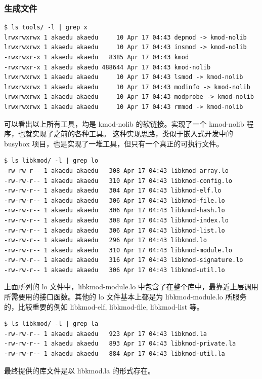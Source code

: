 \documentclass[11pt,a4paper]{article}
\begin{document}
\subsubsection{生成文件}

{\begin{shaded}\begin{verbatim}
$ ls tools/ -l | grep x
lrwxrwxrwx 1 akaedu akaedu     10 Apr 17 04:43 depmod -> kmod-nolib
lrwxrwxrwx 1 akaedu akaedu     10 Apr 17 04:43 insmod -> kmod-nolib
-rwxrwxr-x 1 akaedu akaedu   8385 Apr 17 04:43 kmod
-rwxrwxr-x 1 akaedu akaedu 488644 Apr 17 04:43 kmod-nolib
lrwxrwxrwx 1 akaedu akaedu     10 Apr 17 04:43 lsmod -> kmod-nolib
lrwxrwxrwx 1 akaedu akaedu     10 Apr 17 04:43 modinfo -> kmod-nolib
lrwxrwxrwx 1 akaedu akaedu     10 Apr 17 04:43 modprobe -> kmod-nolib
lrwxrwxrwx 1 akaedu akaedu     10 Apr 17 04:43 rmmod -> kmod-nolib
\end{verbatim}\end{shaded}}
可以看出以上所有工具，均是 kmod-nolib 的软链接。实现了一个 kmod-nolib
程序，也就实现了之前的各种工具。 这种实现思路，类似于嵌入式开发中的
busybox 项目，也是实现了一堆工具，但只有一个真正的可执行文件。

{\begin{shaded}\begin{verbatim}
$ ls libkmod/ -l | grep lo 
-rw-rw-r-- 1 akaedu akaedu   308 Apr 17 04:43 libkmod-array.lo
-rw-rw-r-- 1 akaedu akaedu   310 Apr 17 04:43 libkmod-config.lo
-rw-rw-r-- 1 akaedu akaedu   304 Apr 17 04:43 libkmod-elf.lo
-rw-rw-r-- 1 akaedu akaedu   306 Apr 17 04:43 libkmod-file.lo
-rw-rw-r-- 1 akaedu akaedu   306 Apr 17 04:43 libkmod-hash.lo
-rw-rw-r-- 1 akaedu akaedu   308 Apr 17 04:43 libkmod-index.lo
-rw-rw-r-- 1 akaedu akaedu   306 Apr 17 04:43 libkmod-list.lo
-rw-rw-r-- 1 akaedu akaedu   296 Apr 17 04:43 libkmod.lo
-rw-rw-r-- 1 akaedu akaedu   310 Apr 17 04:43 libkmod-module.lo
-rw-rw-r-- 1 akaedu akaedu   316 Apr 17 04:43 libkmod-signature.lo
-rw-rw-r-- 1 akaedu akaedu   306 Apr 17 04:43 libkmod-util.lo
\end{verbatim}\end{shaded}}
上面所列的 lo 文件中，libkmod-module.lo
中包含了在整个库中，最靠近上层调用所需要用的接口函数。其他的 lo
文件基本上都是为 libkmod-module.lo 所服务的，比较重要的例如 libkmod-elf,
libkmod-file, libkmod-list 等。

{\begin{shaded}\begin{verbatim}
$ ls libkmod/ -l | grep la
-rw-rw-r-- 1 akaedu akaedu   923 Apr 17 04:43 libkmod.la
-rw-rw-r-- 1 akaedu akaedu   893 Apr 17 04:43 libkmod-private.la
-rw-rw-r-- 1 akaedu akaedu   884 Apr 17 04:43 libkmod-util.la
\end{verbatim}\end{shaded}}
最终提供的库文件是以 libkmod.la 的形式存在。
\end{document}
